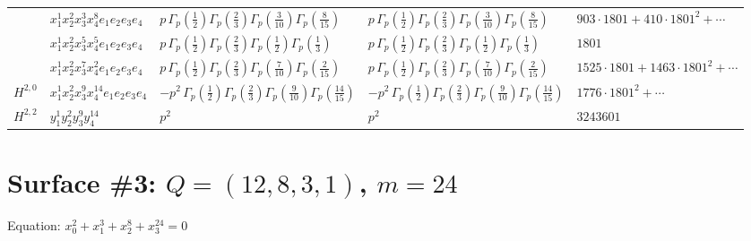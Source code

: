 \documentclass[11pt]{article}
\begin{document}
\begin{table}[ht]
{\begin{tabular}{@{}lllll@{}}
 & $x_{1}^{1} x_{2}^{2} x_{3}^{3} x_{4}^{8}  e_{1} e_{2} e_{3} e_{4}$ & $p \, \Gamma_p \left( \frac{1}{2} \right) \Gamma_p \left( \frac{2}{3} \right) \Gamma_p \left( \frac{3}{10} \right) \Gamma_p \left( \frac{8}{15} \right)$ & $p \, \Gamma_p \left( \frac{1}{2} \right) \Gamma_p \left( \frac{2}{3} \right) \Gamma_p \left( \frac{3}{10} \right) \Gamma_p \left( \frac{8}{15} \right)$ & $903{\cdot}1801{+}410{\cdot}1801^{2}{+}\cdots$ \\
 & $x_{1}^{1} x_{2}^{2} x_{3}^{5} x_{4}^{5}  e_{1} e_{2} e_{3} e_{4}$ & $p \, \Gamma_p \left( \frac{1}{2} \right) \Gamma_p \left( \frac{2}{3} \right) \Gamma_p \left( \frac{1}{2} \right) \Gamma_p \left( \frac{1}{3} \right)$ & $p \, \Gamma_p \left( \frac{1}{2} \right) \Gamma_p \left( \frac{2}{3} \right) \Gamma_p \left( \frac{1}{2} \right) \Gamma_p \left( \frac{1}{3} \right)$ & $1801$ \\
 & $x_{1}^{1} x_{2}^{2} x_{3}^{7} x_{4}^{2}  e_{1} e_{2} e_{3} e_{4}$ & $p \, \Gamma_p \left( \frac{1}{2} \right) \Gamma_p \left( \frac{2}{3} \right) \Gamma_p \left( \frac{7}{10} \right) \Gamma_p \left( \frac{2}{15} \right)$ & $p \, \Gamma_p \left( \frac{1}{2} \right) \Gamma_p \left( \frac{2}{3} \right) \Gamma_p \left( \frac{7}{10} \right) \Gamma_p \left( \frac{2}{15} \right)$ & $1525{\cdot}1801{+}1463{\cdot}1801^{2}{+}\cdots$ \\
\midrule
$H^{2,0}$ & $x_{1}^{1} x_{2}^{2} x_{3}^{9} x_{4}^{14}  e_{1} e_{2} e_{3} e_{4}$ & $- p^{2} \, \Gamma_p \left( \frac{1}{2} \right) \Gamma_p \left( \frac{2}{3} \right) \Gamma_p \left( \frac{9}{10} \right) \Gamma_p \left( \frac{14}{15} \right)$ & $- p^{2} \, \Gamma_p \left( \frac{1}{2} \right) \Gamma_p \left( \frac{2}{3} \right) \Gamma_p \left( \frac{9}{10} \right) \Gamma_p \left( \frac{14}{15} \right)$ & $1776{\cdot}1801^{2}{+}\cdots$ \\
\midrule
$H^{2,2}$ & $y_{1}^{1} y_{2}^{2} y_{3}^{9} y_{4}^{14}$ & $p^{2} \,$ & $p^{2} \,$ & $3243601$ \\
\bottomrule
\end{tabular}
}
\renewcommand{\arraystretch}{1.0}
\end{table}

\newpage

\section*{Surface \#3: $Q=(12, 8, 3, 1)$, $m=24$}

Equation: $x_0^{2} + x_1^{3} + x_2^{8} + x_3^{24} = 0$
\end{document}
